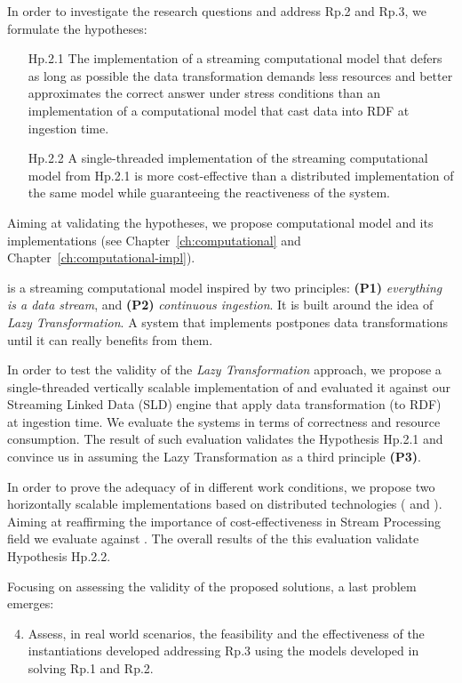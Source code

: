 In order to investigate the research questions and address \textsf{Rp.2} and \textsf{Rp.3}, we formulate the hypotheses: 
\begin{itemize}[leftmargin=42pt]
\item[\textsf{Hp.2.1}] The implementation of a streaming computational model that defers as long as possible the data transformation demands less resources and better approximates the correct answer under stress conditions than an implementation of a computational model that cast data into RDF at ingestion time.
\item[\textsf{Hp.2.2}] A single-threaded implementation of the streaming computational model from \textsf{Hp.2.1} is more cost-effective than a distributed implementation of the same model while guaranteeing the reactiveness of the system.
\end{itemize}

Aiming at validating the hypotheses, we propose \river{} computational model and its implementations (see Chapter~\ref{ch:computational} and Chapter~\ref{ch:computational-impl}).

\river{} is a streaming computational model inspired by two principles: \textbf{(P1)} \textit{everything is a data stream}, and \textbf{(P2)} \textit{continuous ingestion}.
It is built around the idea of \textit{Lazy Transformation}.
A system that implements \river{} postpones data transformations until it can really benefits from them.

In order to test the validity of the \textit{Lazy Transformation} approach, we propose \sti{} a single-threaded vertically scalable implementation of \river{} and evaluated it against our Streaming Linked Data (SLD) engine that  apply data transformation (to RDF) at ingestion time.
We evaluate the systems in terms of correctness and resource consumption.
The result of such evaluation validates the Hypothesis \textsf{Hp.2.1} and convince us in assuming the \textsf{Lazy Transformation} as a third principle \textbf{(P3)}.

In order to prove the adequacy of \river{} in different work conditions, we propose two horizontally scalable implementations based on distributed technologies (\sparkdi{} and \hivedi{}).
Aiming at reaffirming the importance of cost-effectiveness in Stream Processing field we evaluate \sti{} against \sparkdi{}.
The overall results of the this evaluation validate Hypothesis \textsf{Hp.2.2}.

Focusing on assessing the validity of the proposed solutions, a last problem emerges:
\begin{enumerate}[leftmargin=32pt,label=\textsf{Rp.\arabic*}]
\setcounter{enumi}{3}
\item Assess, in real world scenarios, the feasibility and the effectiveness of the instantiations developed addressing \textsf{Rp.3} using the models developed in solving \textsf{Rp.1} and \textsf{Rp.2}.
\end{enumerate}

